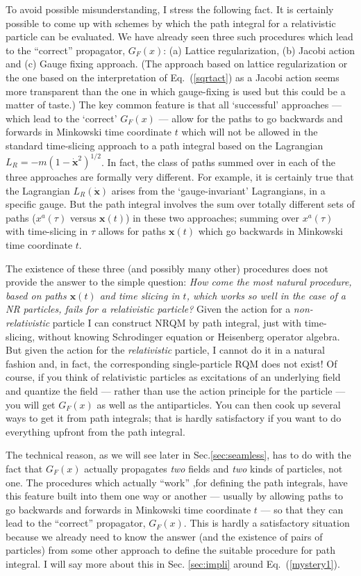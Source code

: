 \documentclass[12pt]{article}
\def\eq#1{{Eq.~(\ref{#1})}}
\begin{document}
To avoid possible misunderstanding, I stress the following fact. It is certainly possible to come up with schemes by which the path integral for a relativistic particle can be evaluated. We have already seen three such procedures which lead to the ``correct'' propagator, $G_F(x)$: (a) Lattice regularization, (b) Jacobi action and (c) Gauge fixing approach.  
(The approach based on lattice regularization or the one based on the interpretation of \eq{sqrtact} as a Jacobi action seems more transparent than the one in which gauge-fixing is used but this could be a matter of taste.) The key common feature is that all `successful' approaches --- which lead to the `correct' $G_F(x)$ --- allow for the paths to go backwards and forwards in Minkowski time coordinate $t$ which will not be allowed in the standard time-slicing approach to a path integral based on the Lagrangian $L_R=-m(1-\dot{\bm x}^2)^{1/2}$. In fact, the class of paths summed over in each of the three approaches are formally very different. For example, it is certainly true that the Lagrangian $L_R(\dot{\bm x})$ arises from the `gauge-invariant' Lagrangians, in a specific gauge. But the path integral involves the sum over totally different sets of paths ($x^a(\tau)$ versus $\bm x(t)$) in these two approaches; summing over $x^a(\tau)$ with time-slicing in $\tau$ allows for paths  $\bm x(t)$ which go backwards in Minkowski time coordinate $t$.

The existence of these three (and possibly many other) procedures does not provide the answer to the simple question: \textit{How come the most natural procedure, based on paths $\bm x(t)$ and time slicing in $t$, which works so well in the case of a NR particles, fails for a relativistic particle?} 
Given the action for a \textit{non-relativistic} particle I can construct NRQM by path integral, just with time-slicing, without knowing Schrodinger equation or Heisenberg operator algebra. But given the action for the \textit{relativistic} particle, I cannot do it in a natural fashion and, in fact, the corresponding single-particle  RQM does not exist!
Of course, if you think of relativistic particles as excitations of an underlying field and quantize the field --- rather than use the action principle for the particle --- you will get $G_F(x)$ as well as the antiparticles. You can then cook up several ways to get it from path integrals; that is hardly satisfactory if you want to do everything upfront from the path integral.

The technical reason, as we will see later in Sec.\ref{sec:seamless}, has to do with the fact that $G_F(x)$ actually propagates \textit{two} fields and \textit{two} kinds of particles, not one. The procedures which actually ``work'' ,for defining the path integrals, have this feature built into them one way or another --- usually by allowing paths to go backwards and forwards  in Minkowski time coordinate $t$ --- so that they can lead to the ``correct'' propagator, $G_F(x)$. This is hardly a satisfactory situation because we already need to know the answer (and  the existence of pairs of particles) from some other approach to define the suitable procedure for path integral. I will say more about this in Sec. \ref{sec:impli} around \eq{mystery1}.
\end{document}
